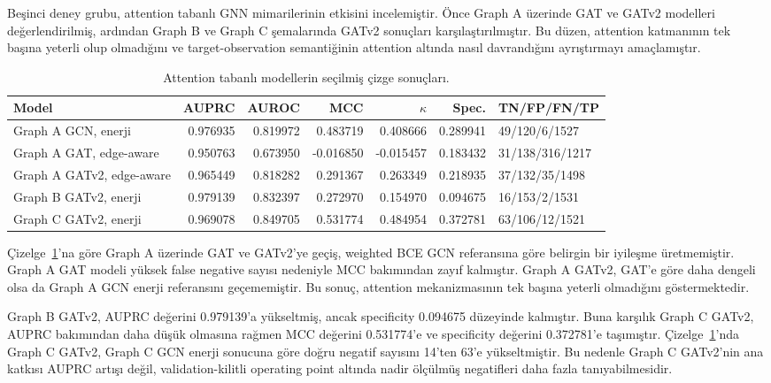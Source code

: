 Beşinci deney grubu, attention tabanlı GNN mimarilerinin etkisini incelemiştir. Önce Graph A üzerinde GAT ve GATv2 modelleri değerlendirilmiş, ardından Graph B ve Graph C şemalarında GATv2 sonuçları karşılaştırılmıştır. Bu düzen, attention katmanının tek başına yeterli olup olmadığını ve target-observation semantiğinin attention altında nasıl davrandığını ayrıştırmayı amaçlamıştır.

\begin{table}[htbp]
\caption{Attention tabanlı modellerin seçilmiş çizge sonuçları.}
\label{tab:attention-sonuclari}
\centering
\scriptsize
\begin{tabularx}{\textwidth}{>{\raggedright\arraybackslash}X r r r r r l}
\toprule\toprule
Model & AUPRC & AUROC & MCC & $\kappa$ & Spec. & TN/FP/FN/TP\\
\midrule
Graph A GCN, enerji & 0.976935 & 0.819972 & 0.483719 & 0.408666 & 0.289941 & 49/120/6/1527\\
Graph A GAT, edge-aware & 0.950763 & 0.673950 & -0.016850 & -0.015457 & 0.183432 & 31/138/316/1217\\
Graph A GATv2, edge-aware & 0.965449 & 0.818282 & 0.291367 & 0.263349 & 0.218935 & 37/132/35/1498\\
Graph B GATv2, enerji & 0.979139 & 0.832397 & 0.272970 & 0.154970 & 0.094675 & 16/153/2/1531\\
Graph C GATv2, enerji & 0.969078 & 0.849705 & 0.531774 & 0.484954 & 0.372781 & 63/106/12/1521\\
\bottomrule
\end{tabularx}
\end{table}

Çizelge~\ref{tab:attention-sonuclari}'na göre Graph A üzerinde GAT ve GATv2'ye geçiş, weighted BCE GCN referansına göre belirgin bir iyileşme üretmemiştir. Graph A GAT modeli yüksek false negative sayısı nedeniyle MCC bakımından zayıf kalmıştır. Graph A GATv2, GAT'e göre daha dengeli olsa da Graph A GCN enerji referansını geçememiştir. Bu sonuç, attention mekanizmasının tek başına yeterli olmadığını göstermektedir.

Graph B GATv2, AUPRC değerini 0.979139'a yükseltmiş, ancak specificity 0.094675 düzeyinde kalmıştır. Buna karşılık Graph C GATv2, AUPRC bakımından daha düşük olmasına rağmen MCC değerini 0.531774'e ve specificity değerini 0.372781'e taşımıştır. Çizelge~\ref{tab:attention-sonuclari}'nda Graph C GATv2, Graph C GCN enerji sonucuna göre doğru negatif sayısını 14'ten 63'e yükseltmiştir. Bu nedenle Graph C GATv2'nin ana katkısı AUPRC artışı değil, validation-kilitli operating point altında nadir ölçülmüş negatifleri daha fazla tanıyabilmesidir.

